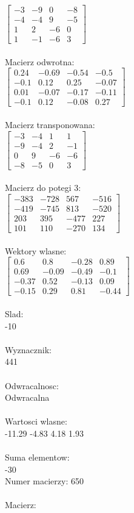 \documentclass[a4paper,12pt]{article}
\begin{document}
$\begin{bmatrix} -3&-9&0&-8\\-4&-4&9&-5\\1&2&-6&0\\1&-1&-6&3 \end{bmatrix}$
\\
\\
Macierz odwrotna:\\

$\begin{bmatrix} 0.24&-0.69&-0.54&-0.5\\-0.1&0.12&0.25&-0.07\\0.01&-0.07&-0.17&-0.11\\-0.1&0.12&-0.08&0.27 \end{bmatrix}$
\\
\\
Macierz transponowana:\\

$\begin{bmatrix} -3&-4&1&1\\-9&-4&2&-1\\0&9&-6&-6\\-8&-5&0&3 \end{bmatrix}$
\\
\\
Macierz do potegi 3:\\

$\begin{bmatrix} -383&-728&567&-516\\-419&-745&813&-520\\203&395&-477&227\\101&110&-270&134 \end{bmatrix}$
\\
\\
Wektory wlasne:\\

$\begin{bmatrix} 0.6&0.8&-0.28&0.89\\0.69&-0.09&-0.49&-0.1\\-0.37&0.52&-0.13&0.09\\-0.15&0.29&0.81&-0.44 \end{bmatrix}$
\\
\\
Slad:\\
-10
\\
\\
Wyznacznik:\\
441
\\
\\
Odwracalnosc:\\
Odwracalna
\\
\\
Wartosci wlasne:\\
-11.29 -4.83 4.18 1.93
\\
\\
Suma elementow:\\
-30
\\
\newpage
Numer macierzy:
650
\\
\\
Macierz:\\
\end{document}
